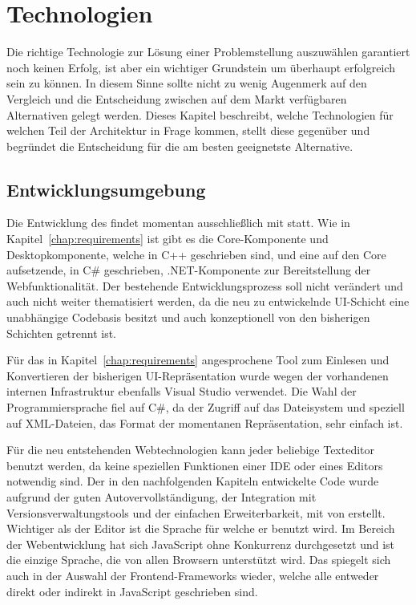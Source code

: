 \chapter{Technologien}\label{chap:technologies}

Die richtige Technologie zur Lösung einer Problemstellung auszuwählen garantiert noch keinen Erfolg, ist aber ein wichtiger Grundstein um überhaupt erfolgreich sein zu können. In diesem Sinne sollte nicht zu wenig Augenmerk auf den Vergleich und die Entscheidung zwischen auf dem Markt verfügbaren Alternativen gelegt werden. Dieses Kapitel beschreibt, welche Technologien für welchen Teil der Architektur in Frage kommen, stellt diese gegenüber und begründet die Entscheidung für die am besten geeignetste Alternative.

\section{Entwicklungsumgebung}
Die Entwicklung des  findet momentan ausschließlich mit  statt. Wie in Kapitel~\ref{chap:requirements} ist gibt es die Core-Komponente und Desktopkomponente, welche in C++ geschrieben sind, und eine auf den Core aufsetzende, in C\# geschrieben, .NET-Komponente zur Bereitstellung der Webfunktionalität. Der bestehende Entwicklungsprozess soll nicht verändert und auch nicht weiter thematisiert werden, da die neu zu entwickelnde UI-Schicht eine unabhängige Codebasis besitzt und auch konzeptionell von den bisherigen Schichten getrennt ist. 

Für das in Kapitel~\ref{chap:requirements} angesprochene Tool zum Einlesen und Konvertieren der bisherigen UI-Repräsentation wurde wegen der vorhandenen internen Infrastruktur ebenfalls Visual Studio verwendet. Die Wahl der Programmiersprache fiel auf C\#, da der Zugriff auf das Dateisystem und speziell auf XML-Dateien, das Format der momentanen Repräsentation, sehr einfach ist. 

Für die neu entstehenden Webtechnologien kann jeder beliebige Texteditor benutzt werden, da keine speziellen Funktionen einer IDE oder eines Editors notwendig sind. Der in den nachfolgenden Kapiteln entwickelte Code wurde aufgrund der guten Autovervollständigung, der Integration mit Versionsverwaltungstools und der einfachen Erweiterbarkeit, mit  von  erstellt. Wichtiger als der Editor ist die Sprache für welche er benutzt wird. Im Bereich der Webentwicklung hat sich JavaScript ohne Konkurrenz durchgesetzt und ist die einzige Sprache, die von allen Browsern unterstützt wird. Das spiegelt sich auch in der Auswahl der Frontend-Frameworks wieder, welche alle entweder direkt oder indirekt in JavaScript geschrieben sind.   


